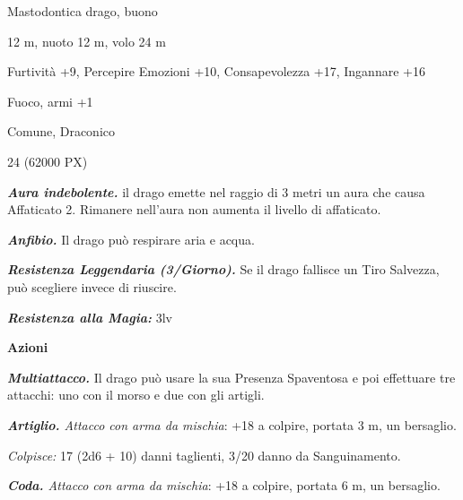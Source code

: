 \begin{multicols}{2}
{
\begin{description}[noitemsep, topsep=0pt, parsep=0pt, partopsep=0pt, itemsep=1pt, leftmargin=2.35cm,  labelwidth=2.2cm, itemindent=0cm, listparindent=0pt] %
\setlength{\baselineskip}{10pt}
\item[\textbf{Taglia/Tipo}] Mastodontica drago, buono
\item[\textbf{Caratt.}] 
\item[\textbf{Punti Ferita}] 
\item[\textbf{Movimento}] 12 m, nuoto 12 m, volo 24 m
\item[\textbf{Tiri Salvez.}] 
\item[\textbf{Comp.}] Furtività +9, Percepire Emozioni +10, Consapevolezza +17, Ingannare +16
\item[\textbf{Imm. Danni}] Fuoco, armi +1
\item[\textbf{Sensi}] 
\item[\textbf{Linguaggi}] Comune, Draconico
\item[\textbf{Sfida}] 24 (62000 PX)
\end{description}
\smallskip

\emph{\textbf{Aura indebolente.}} il drago emette nel raggio di 3 metri un aura che causa Affaticato 2. Rimanere nell'aura non aumenta il livello di affaticato.

\emph{\textbf{Anfibio.}} Il drago può respirare aria e acqua.

\emph{\textbf{Resistenza Leggendaria (3/Giorno).}} Se il drago fallisce un Tiro Salvezza, può scegliere invece di riuscire.

\emph{\textbf{Resistenza alla Magia:}} 3lv

\textbf{Azioni}

\emph{\textbf{Multiattacco.}} Il drago può usare la sua Presenza Spaventosa e poi effettuare tre attacchi: uno con il morso e due con gli artigli.

\emph{\textbf{Artiglio.} Attacco con arma da mischia}: +18 a colpire, portata 3 m, un bersaglio.

\emph{Colpisce:} 17 (2d6 + 10) danni taglienti, 3/20 danno da Sanguinamento.

\emph{\textbf{Coda.} Attacco con arma da mischia}: +18 a colpire, portata 6 m, un bersaglio.

}
\end{multicols}
